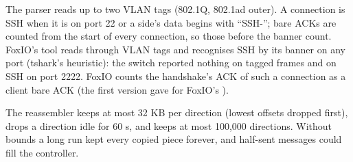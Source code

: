 {The parser reads up to two VLAN tags (802.1Q, 802.1ad outer). A connection is SSH when it is on port 22 or a side's
data begins with ``SSH-''; bare ACKs are counted from the start of every connection, so those before the banner
count.}
{FoxIO's tool reads through VLAN tags and recognises SSH by its banner on any port (tshark's heuristic): the switch
reported nothing on tagged frames and on SSH on port 2222. FoxIO counts the handshake's ACK of such a connection as
a client bare ACK (the first version gave  for FoxIO's ).}

{The reassembler keeps at most 32 KB per direction (lowest offsets dropped first), drops a direction idle for 60 s,
and keeps at most 100,000 directions.}
{Without bounds a long run kept every copied piece forever, and half-sent messages could fill the controller.}
